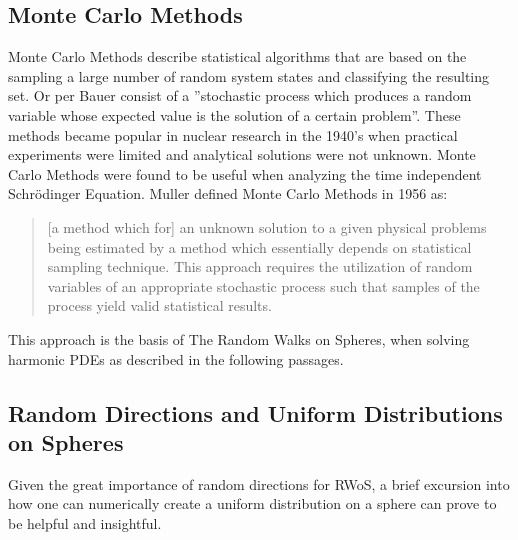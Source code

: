 \subsection{Monte Carlo Methods}\label{sssec:montecarlo}
Monte Carlo Methods describe statistical algorithms that are based on the sampling a
large number of random system states and classifying the resulting set\cite{Metropolis}.
Or per Bauer consist of a ''stochastic process which produces a random variable
 whose expected value is the solution of a certain problem''\cite{bauer}.
These methods became popular in nuclear research in the 1940's when practical
experiments were limited and analytical solutions were not unknown.  Monte Carlo
Methods were found to be useful when analyzing the time independent Schrödinger
Equation\cite{Metropolis}. Muller defined
Monte Carlo Methods in 1956 as: \begin{quote}[a method which for] an unknown solution to a given physical
problems being estimated by a method which essentially depends on statistical sampling technique.
This approach requires the utilization of random variables of an appropriate
stochastic process such that samples of the process yield valid statistical results\cite{Muller}.\end{quote}
This approach is the basis of The Random Walks on Spheres, when solving harmonic \Glspl{PDE} as described in the
following passages.
\subsection{Random Directions and Uniform Distributions on Spheres}
Given the great importance of random directions for \Gls{RWoS}, a brief excursion
into how one can numerically create a uniform distribution on a sphere can prove
to be helpful and insightful.
\cite{Yang,Muller1959,marsaglia1972}


